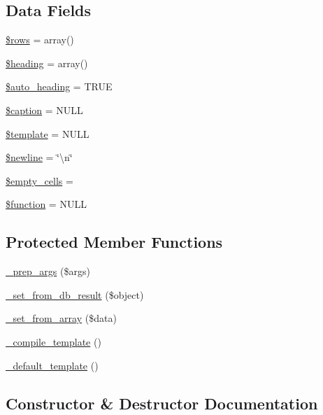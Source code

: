 \subsection*{Data Fields}
\begin{DoxyCompactItemize}
\item 
\hyperlink{class_c_i___table_ace2ec39e7df3899fa8df9640ec274b03}{\$rows} = array()
\item 
\hyperlink{class_c_i___table_a196169be7715d466e3310388b096598c}{\$heading} = array()
\item 
\hyperlink{class_c_i___table_a394ea4ec17bcd63228039d7767bfb092}{\$auto\+\_\+heading} = T\+R\+U\+E
\item 
\hyperlink{class_c_i___table_a4f9340ccb02c5d876a448a1d860f3812}{\$caption} = N\+U\+L\+L
\item 
\hyperlink{class_c_i___table_aa3e9534005fd516d941f6a5569896e01}{\$template} = N\+U\+L\+L
\item 
\hyperlink{class_c_i___table_a8735d5c31c4af1004825e6a28f236aeb}{\$newline} = \char`\"{}\textbackslash{}n\char`\"{}
\item 
\hyperlink{class_c_i___table_aeba996c863f9ba0e2c9e24d0491bb976}{\$empty\+\_\+cells} = \textquotesingle{}\textquotesingle{}
\item 
\hyperlink{class_c_i___table_af3e5d0d1ff43879d493dd97bb760c479}{\$function} = N\+U\+L\+L
\end{DoxyCompactItemize}
\subsection*{Protected Member Functions}
\begin{DoxyCompactItemize}
\item 
\hyperlink{class_c_i___table_aec91c20b757a8a063e4147f0aebe8b1b}{\+\_\+prep\+\_\+args} (\$args)
\item 
\hyperlink{class_c_i___table_a76d76f4f5ffe03c119b95164dcebf9ed}{\+\_\+set\+\_\+from\+\_\+db\+\_\+result} (\$object)
\item 
\hyperlink{class_c_i___table_a79c6ca8fd1f4e5b4bee157209e866a02}{\+\_\+set\+\_\+from\+\_\+array} (\$data)
\item 
\hyperlink{class_c_i___table_a7f408fd4eecadb5799d5ae004170c4d6}{\+\_\+compile\+\_\+template} ()
\item 
\hyperlink{class_c_i___table_ae1990fcb9ffc455614eeac9a1091f0b0}{\+\_\+default\+\_\+template} ()
\end{DoxyCompactItemize}


\subsection{Constructor \& Destructor Documentation}
\hypertarget{class_c_i___table_af7f9493844d2d66e924e3c1df51ce616}{}
